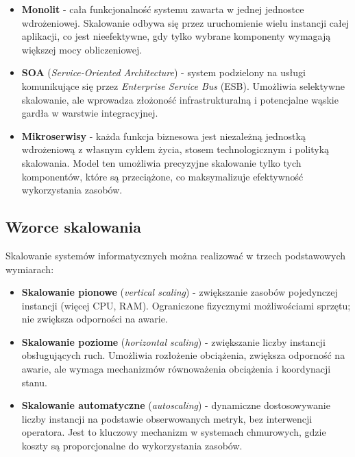\begin{itemize}
  \item \textbf{Monolit} - cała funkcjonalność systemu zawarta w jednej jednostce wdrożeniowej. Skalowanie odbywa się przez uruchomienie wielu instancji całej aplikacji, co jest nieefektywne, gdy tylko wybrane komponenty wymagają większej mocy obliczeniowej.
  \item \textbf{SOA} (\textit{Service-Oriented Architecture}) - system podzielony na usługi komunikujące się przez \textit{Enterprise Service Bus} (ESB). Umożliwia selektywne skalowanie, ale wprowadza złożoność infrastrukturalną i potencjalne wąskie gardła w warstwie integracyjnej.
  \item \textbf{Mikroserwisy} - każda funkcja biznesowa jest niezależną jednostką wdrożeniową z własnym cyklem życia, stosem technologicznym i polityką skalowania. Model ten umożliwia precyzyjne skalowanie tylko tych komponentów, które są przeciążone, co maksymalizuje efektywność wykorzystania zasobów.
\end{itemize}
\subsection{Wzorce skalowania}

Skalowanie systemów informatycznych można realizować w trzech podstawowych wymiarach:

\begin{itemize}
  \item \textbf{Skalowanie pionowe} (\textit{vertical scaling}) - zwiększanie zasobów pojedynczej instancji (więcej CPU, RAM). Ograniczone fizycznymi możliwościami sprzętu; nie zwiększa odporności na awarie.
  \item \textbf{Skalowanie poziome} (\textit{horizontal scaling}) - zwiększanie liczby instancji obsługujących ruch. Umożliwia rozłożenie obciążenia, zwiększa odporność na awarie, ale wymaga mechanizmów równoważenia obciążenia i koordynacji stanu.
  \item \textbf{Skalowanie automatyczne} (\textit{autoscaling}) - dynamiczne dostosowywanie liczby instancji na podstawie obserwowanych metryk, bez interwencji operatora. Jest to kluczowy mechanizm w systemach chmurowych, gdzie koszty są proporcjonalne do wykorzystania zasobów.
\end{itemize}

